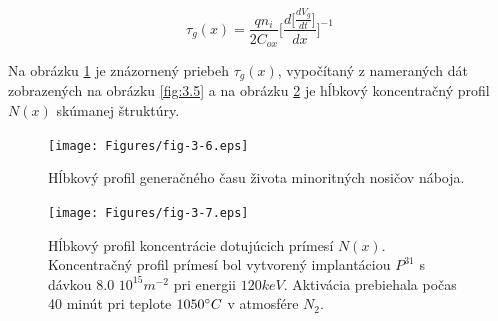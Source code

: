 \begin{equation}\label{eq:3.10}
\tau_g(x) = \frac{qn_i}{2C_{ox}} \Bigg[\frac{d\big[\frac{dV_g}{dt}\big]}{dx}\Bigg]^{-1}
\end{equation}

Na obrázku \ref{fig:3.6} je znázornený priebeh $\tau_g(x)$, vypočítaný
z nameraných dát zobrazených na obrázku \ref{fig:3.5} a na obrázku
\ref{fig:3.7} je hĺbkový koncentračný profil $N(x)$ skúmanej
štruktúry.

\begin{figure}[h!]\centering
\texttt{[image: Figures/fig-3-6.eps]}
\captionsetup{justification=raggedright, singlelinecheck=false}
\caption[Hĺbkový profil generačného času života minoritných nosičov
  náboja]{Hĺbkový profil generačného času života minoritných nosičov
  náboja.}
\label{fig:3.6}
\end{figure}

\begin{figure}[h!]\centering
\texttt{[image: Figures/fig-3-7.eps]}
\captionsetup{justification=raggedright, singlelinecheck=false}
\caption[Hĺbkový profil koncentrácie dotujúcich prímesí
  $N(x)$]{Hĺbkový profil koncentrácie dotujúcich prímesí
  $N(x)$. Koncentračný profil prímesí bol vytvorený implantáciou
  $P^{31}$ s dávkou $8.0$ $10^{15}m^{-2}$ pri energii $120 keV$.
  Aktivácia prebiehala počas 40 minút pri teplote $1050 \degree C$ v
  atmosfére $N_2$.}
\label{fig:3.7}
\end{figure}


